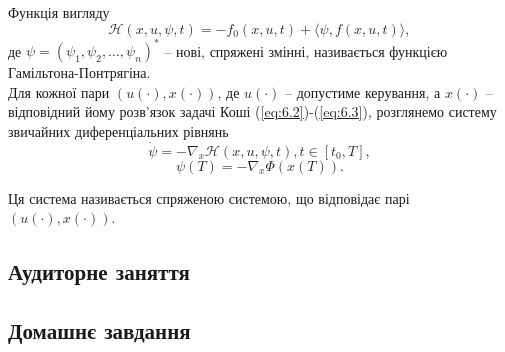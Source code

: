 Функція вигляду
\begin{equation}
    \label{eq:6.4}
    \mathcal{H}(x, u, \psi, t) = - f_0(x, u, t) + \langle \psi, f(x, u, t) \rangle,
\end{equation}
де $\psi = (\psi_1, \psi_2, \ldots, \psi_n)^*$ -- нові, спряжені змінні, називається функцією Гамільтона-Понтрягіна. \\

Для кожної пари $(u(\cdot), x(\cdot))$, де $u(\cdot)$ -- допустиме керування, а $x(\cdot)$ -- відповідний йому розв'язок задачі Коші (\ref{eq:6.2})-(\ref{eq:6.3}), розглянемо систему звичайних диференціальних рівнянь
\begin{equation}
    \label{eq:6.5}
    \dot \psi = - \nabla_x \mathcal{H}(x, u, \psi, t), t \in [t_0, T],
\end{equation}
\begin{equation}
    \label{eq:6.6}
    \psi(T) = - \nabla_x \Phi(x(T)).
\end{equation}

Ця система називається спряженою системою, що відповідає парі $(u(\cdot), x(\cdot))$.

\subsection{Аудиторне заняття}

\begin{problem}

\end{problem}

\begin{problem}

\end{problem}

\begin{problem}

\end{problem}

\begin{problem}

\end{problem}

\begin{problem}

\end{problem}

\begin{problem}

\end{problem}

\subsection{Домашнє завдання}

